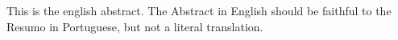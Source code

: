 \begin{Abstract}
 This is the english abstract. The Abstract in English should be faithful to the
 Resumo in Portuguese, but not a literal translation.
\end{Abstract}

